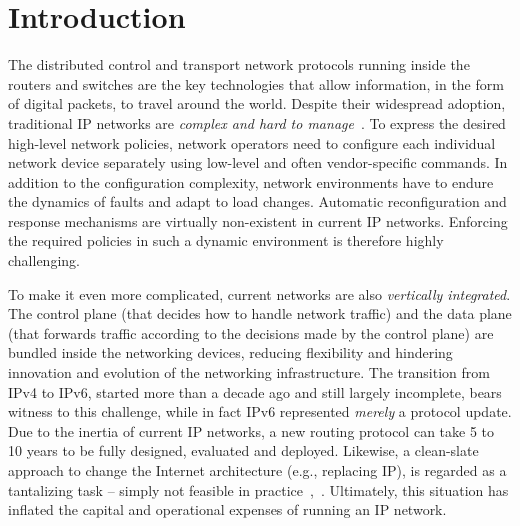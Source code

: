 \section{Introduction}




The distributed control and transport network protocols running inside the 
routers and switches are the key technologies that allow information, 
in the form of digital packets, to travel around the world. Despite 
their widespread adoption, traditional IP networks are \emph{complex and hard to manage}~\cite{benson2009}.
To express the desired high-level network policies, network operators
need to configure each individual network device separately using 
low-level and often vendor-specific commands. In addition to the 
configuration complexity, network environments have to endure the 
dynamics of faults and adapt to load changes. Automatic reconfiguration
and response mechanisms are virtually non-existent in current IP networks.
Enforcing the required policies in such a dynamic environment is therefore
highly challenging.

To make it even more complicated, current networks are also
\emph{vertically integrated}.  The control plane (that decides how to
handle network traffic) and the data plane (that forwards traffic
according to the decisions made by the control plane) are bundled inside
the networking devices, reducing flexibility and hindering innovation
and evolution of the networking infrastructure.  The transition from 
IPv4 to IPv6, started more than a decade ago and still largely incomplete, 
bears witness to this challenge, while in fact IPv6 represented \textit{merely} 
a protocol update. Due to the inertia of current IP networks, a new 
routing protocol can take 5 to 10 years to be fully designed, evaluated and deployed.
Likewise, a clean-slate approach to change the Internet architecture (e.g., 
replacing IP), is regarded as a tantalizing task -- simply not feasible in practice~\cite{raghavan2012},~\cite{ghodsi2011}. 
Ultimately, this situation has inflated the capital and operational expenses of 
running an IP network.

